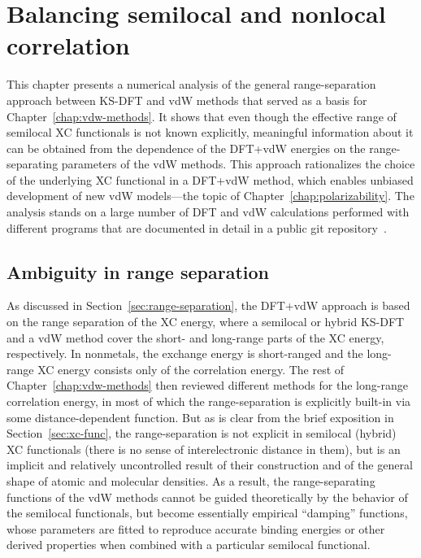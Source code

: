 \chapter{Balancing semilocal and nonlocal correlation}\label{chap:xc-functionals}

{\sffamily{} This chapter presents a numerical analysis of the general range-separation approach between KS-DFT and vdW methods that served as a basis for Chapter~\ref{chap:vdw-methods}.
It shows that even though the effective range of semilocal XC functionals is not known explicitly, meaningful information about it can be obtained from the dependence of the DFT+vdW energies on the range-separating parameters of the vdW methods.
This approach rationalizes the choice of the underlying XC functional in a DFT+vdW method, which enables unbiased development of new vdW models---the topic of Chapter~\ref{chap:polarizability}.
The analysis stands on a large number of DFT and vdW calculations performed with different programs that are documented in detail in a public git repository~\citep{GitRepo}.
}

\section{Ambiguity in range separation}

As discussed in Section~\ref{sec:range-separation}, the DFT+vdW approach is based on the range separation of the XC energy, where a semilocal or hybrid KS-DFT and a vdW method cover the short- and long-range parts of the XC energy, respectively.
In nonmetals, the exchange energy is short-ranged and the long-range XC energy consists only of the correlation energy.
The rest of Chapter~\ref{chap:vdw-methods} then reviewed different methods for the long-range correlation energy, in most of which the range-separation is explicitly built-in via some distance-dependent function.
But as is clear from the brief exposition in Section~\ref{sec:xc-func}, the range-separation is not explicit in semilocal (hybrid) XC functionals (there is no sense of interelectronic distance in them), but is an implicit and relatively uncontrolled result of their construction and of the general shape of atomic and molecular densities.
As a result, the range-separating functions of the vdW methods cannot be guided theoretically by the behavior of the semilocal functionals, but become essentially empirical ``damping'' functions, whose parameters are fitted to reproduce accurate binding energies or other derived properties when combined with a particular semilocal functional.


